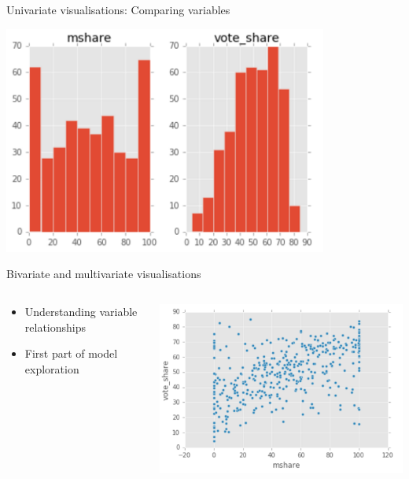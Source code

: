 \documentclass{beamer}
\begin{document}
\begin{frame}{Univariate visualisations: Comparing variables}
    \begin{center}
        \includegraphics[width=0.8\textwidth]{img/mshare-voteshare-hist.png}
    \end{center}
\end{frame}

\begin{frame}{Bivariate and multivariate visualisations}
    \begin{columns}
        \begin{column}{0.4\textwidth}
            \begin{itemize}[<+->]
                \item Understanding variable relationships
                \item First part of model exploration
            \end{itemize}
        \end{column}
        \begin{column}{0.6\textwidth}
            \includegraphics[width=\textwidth]{img/mshare-voteshare-scatter.png}
        \end{column}
    \end{columns}    
\end{frame}
\end{document}
